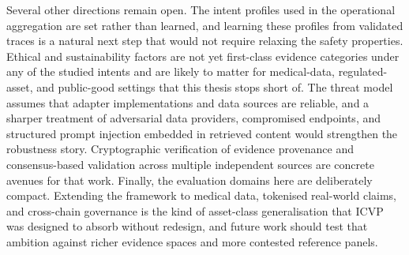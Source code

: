 Several other directions remain open. The intent profiles used in the operational aggregation are set rather than learned, and learning these profiles from validated traces is a natural next step that would not require relaxing the safety properties. Ethical and sustainability factors are not yet first-class evidence categories under any of the studied intents and are likely to matter for medical-data, regulated-asset, and public-good settings that this thesis stops short of. The threat model assumes that adapter implementations and data sources are reliable, and a sharper treatment of adversarial data providers, compromised endpoints, and structured prompt injection embedded in retrieved content would strengthen the robustness story. Cryptographic verification of evidence provenance and consensus-based validation across multiple independent sources are concrete avenues for that work. Finally, the evaluation domains here are deliberately compact. Extending the framework to medical data, tokenised real-world claims, and cross-chain governance is the kind of asset-class generalisation that ICVP was designed to absorb without redesign, and future work should test that ambition against richer evidence spaces and more contested reference panels.
